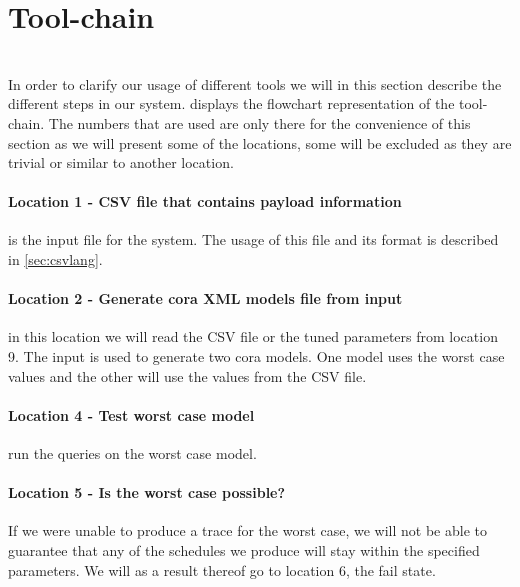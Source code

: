 \section{Tool-chain} \label{sec:tool_chainv3}
\\
In order to clarify our usage of different tools we will in this section describe the different steps in our system.  displays the flowchart representation of the tool-chain. The numbers that are used are only there for the convenience of this section as we will present some of the locations, some will be excluded as they are trivial or similar to another location. 

\paragraph{Location 1 - CSV file that contains payload information} is the input file for the system. The usage of this file and its format is described in \cref{sec:csvlang}.

\paragraph{Location 2 - Generate \gls{cora} XML models file from input} in this location we will read the CSV file or the tuned parameters from location 9. The input is used to generate two \gls{cora} models. One model uses the worst case values and the other will use the values from the CSV file. 


\paragraph{Location 4 - Test worst case model} run the queries on the worst case model.

\paragraph{Location 5 - Is the worst case possible?} If we were unable to produce a trace for the worst case, we will not be able to guarantee that any of the schedules we produce will stay within the specified parameters. We will as a result thereof go to location 6, the fail state.

